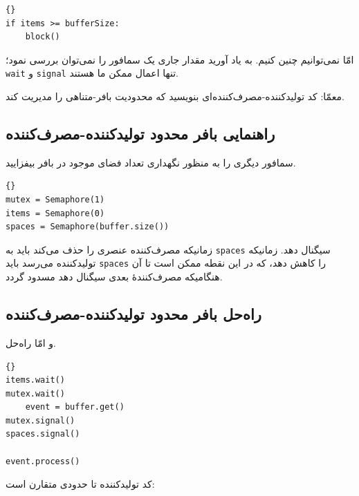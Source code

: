 \documentclass{book}
\newcommand{\clearemptydoublepage}{\newpage\cleardoublepage}
\begin{document}
\begin{latin}
\begin{lstlisting}[title=\rl{راه‌حل معیوب بافر محدود}]{}
if items >= bufferSize:
    block()
\end{lstlisting}
\end{latin}

    امّا نمی‌توانیم چنین کنیم. به یاد آورید مقدار جاری یک سمافور را نمی‌توان بررسی نمود؛ {\tt wait} و {\tt signal} تنها  اعمال ممکن ما هستند. 
    
    معمّا: کد تولیدکننده-مصرف‌کننده‌ای بنویسید که محدودیت بافر-متناهی را مدیریت کند. 
    

\clearemptydoublepage
\subsection{ راهنمایی بافر محدود تولیدکننده-مصرف‌کننده }

    سمافور دیگری را به منظور نگهداری تعداد فضای موجود در بافر  بیفزایید. 
\begin{latin}
\begin{lstlisting}[title=\rl{مقداردهی اولیهٔ بافر محدود تولیدکننده-مصرف‌کننده}]{}
mutex = Semaphore(1)
items = Semaphore(0)
spaces = Semaphore(buffer.size())
\end{lstlisting}
\end{latin}

    زمانیکه مصرف‌کننده عنصری را حذف می‌کند باید به {\tt spaces} سیگنال دهد. 
    زمانیکه تولیدکننده می‌رسد باید {\tt spaces} را کاهش دهد، که در این نقطه ممکن است تا آن هنگامیکه مصرف‌کنندهٔ بعدی سیگنال دهد مسدود گردد. 


\clearemptydoublepage
\subsection{ راه‌حل بافر محدود تولیدکننده-مصرف‌کننده }

    و امّا راه‌حل. 

\begin{latin}
\begin{lstlisting}[title=\rl{راه‌حل  بافر محدود  مصرف‌کننده}]{}
items.wait()
mutex.wait()
    event = buffer.get()
mutex.signal()
spaces.signal()

event.process()
\end{lstlisting}
\end{latin}

    کد تولیدکننده  تا حدودی متقارن است: 
\end{document}
